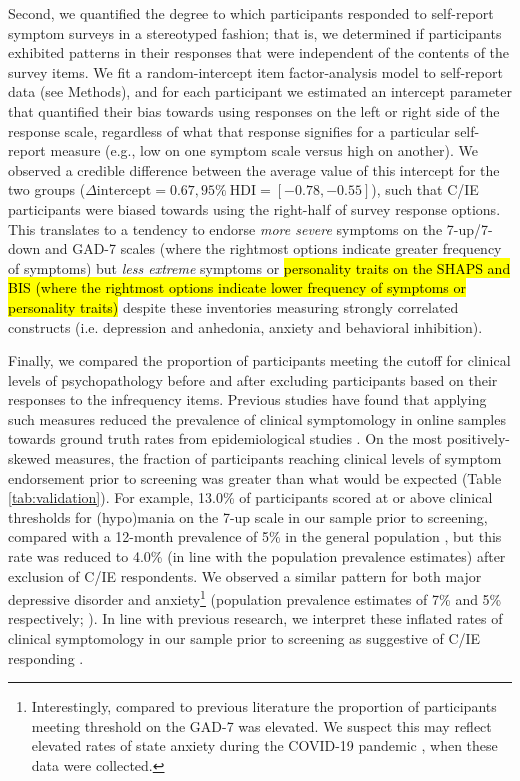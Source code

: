 \documentclass[a4paper,notitlepage,12pt]{article}
\begin{document}
\begin{refsection}[main]
Second, we quantified the degree to which participants responded to self-report symptom surveys in a stereotyped fashion; that is, we determined if participants exhibited patterns in their responses that were independent of the contents of the survey items. We fit a random-intercept item factor-analysis model \cite{maydeu2006random} to self-report data (see Methods), and for each participant we estimated an intercept parameter that quantified their bias towards using responses on the left or right side of the response scale, regardless of what that response signifies for a particular self-report measure (e.g., low on one symptom scale versus high on another). We observed a credible difference between the average value of this intercept for the two groups ($\Delta \text{intercept} = 0.67, 95\% \ \text{HDI} = [-0.78, -0.55]$), such that C/IE participants were biased towards using the right-half of survey response options. This translates to a tendency to endorse \emph{more severe} symptoms on the 7-up/7-down and GAD-7 scales (where the rightmost options indicate greater frequency of symptoms) but \emph{less extreme} symptoms or \hl{personality traits on the SHAPS and BIS (where the rightmost options indicate lower frequency of symptoms or personality traits)} despite these inventories measuring strongly correlated constructs (i.e. depression and anhedonia, anxiety and behavioral inhibition).

Finally, we compared the proportion of participants meeting the cutoff for clinical levels of psychopathology before and after excluding participants based on their responses to the infrequency items. Previous studies have found that applying such measures reduced the prevalence of clinical symptomology in online samples towards ground truth rates from epidemiological studies \cite{ophir2020turker}. On the most positively-skewed measures, the fraction of participants reaching clinical levels of symptom endorsement prior to screening was greater than what would be expected (Table \ref{tab:validation}). For example, 13.0\% of participants scored at or above clinical thresholds for (hypo)mania on the 7-up scale in our sample prior to screening, compared with a 12-month prevalence of 5\% in the general population \cite{merikangas2007lifetime, merikangas2012true}, but this rate was reduced to 4.0\% (in line with the population prevalence estimates) after exclusion of C/IE respondents. We observed a similar pattern for both major depressive disorder and anxiety\footnote{Interestingly, compared to previous literature the proportion of participants meeting threshold on the GAD-7 was elevated. We suspect this may reflect elevated rates of state anxiety during the COVID-19 pandemic \cite{yarrington2021impact}, when these data were collected.} (population prevalence estimates of 7\% and 5\% respectively; \cite{kessler2012twelve, lowe2008validation, hinz2017psychometric}).  In line with previous research, we interpret these inflated rates of clinical symptomology in our sample prior to screening as suggestive of C/IE responding \cite{ophir2020turker}.


\end{refsection}
\end{document}
